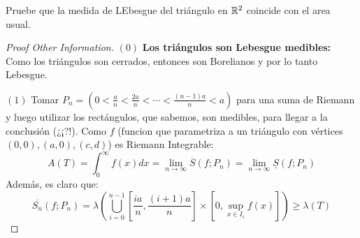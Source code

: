 \noindent Pruebe que la medida de LEbesgue del triángulo en $\mathbb{R}^2$ coincide con el area usual.

\begin{proof}[Proof Other Information]
	$(0)$ \textbf{Los triángulos son Lebesgue medibles:} Como los triángulos son cerrados, entonces son Borelianos y por lo tanto Lebesgue.
	
	$(1)$ Tomar $P_n = ( 0 < \frac{a}{n} < \frac{2a}{n} < \cdots < \frac{(n-1)a}{n} < a)$ para una suma de Riemann y luego utilizar los rectángulos, que sabemos, son medibles, para llegar a la conclusión (¿¡?!). Como $f$ (funcion que parametriza a un triángulo con vértices $(0,0), (a,0), (c,d)$) es Riemann Integrable:
	\[ A(T) = \int_{0}^{\infty} f(x)dx = \lim_{n \to \infty} \overline{S} (f;P_n) = \lim_{n \to \infty}  \underline{S}(f;P_n) \]
	Además, es claro que:
	\[ \overline{S_n}(f;P_n) = \lambda \left( \bigcup_{i=0}^{n-1}\left[ \frac{ia}{n},\frac{(i+1)a}{n} \right] \times \left[ 0,\sup_{x\in I_i} f(x) \right] \right) \geq \lambda(T) \]
\end{proof}
